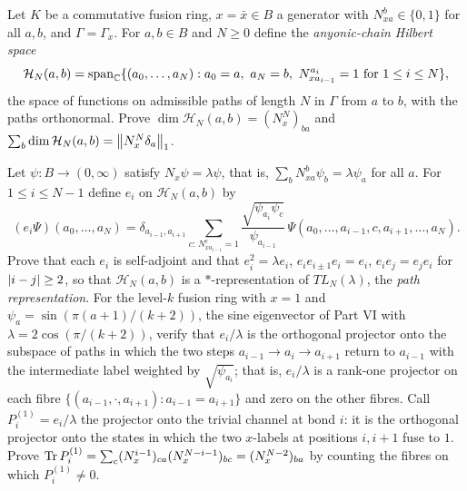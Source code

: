 \begin{exercise}
Let $K$ be a commutative fusion ring, $x=\bar x\in B$ a generator with $N_{xa}^b\in\{0,1\}$ for all $a,b$, and $\Gamma=\Gamma_x$. For $a,b\in B$ and $N\ge0$ define the \emph{anyonic-chain Hilbert space}
\[
\mathcal H_N(a,b)=\mathrm{span}_\C\{(a_0,\dots,a_N):a_0=a,\ a_N=b,\ N_{xa_{i-1}}^{a_i}=1\text{ for }1\le i\le N\},
\]
the space of functions on admissible paths of length $N$ in $\Gamma$ from $a$ to $b$, with the paths orthonormal. Prove $\dim\mathcal H_N(a,b)=(N_x^N)_{ba}$ and $\sum_b\dim\mathcal H_N(a,b)=\left\lVert N_x^N\delta_a\right\rVert_1$.

Let $\psi\colon B\to(0,\infty)$ satisfy $N_x\psi=\lambda\psi$, that is, $\sum_bN_{xa}^b\psi_b=\lambda\psi_a$ for all $a$. For $1\le i\le N-1$ define $e_i$ on $\mathcal H_N(a,b)$ by
\[
(e_i\Psi)(a_0,\dots,a_N)=\delta_{a_{i-1},a_{i+1}}\sum_{c:\,N_{xa_{i-1}}^c=1}\frac{\sqrt{\psi_{a_i}\psi_c}}{\psi_{a_{i-1}}}\,\Psi(a_0,\dots,a_{i-1},c,a_{i+1},\dots,a_N).
\]
Prove that each $e_i$ is self-adjoint and that $e_i^2=\lambda e_i$, $e_ie_{i\pm1}e_i=e_i$, $e_ie_j=e_je_i$ for $\left\lvert i-j\right\rvert\ge2$, so that $\mathcal H_N(a,b)$ is a $*$-representation of $TL_N(\lambda)$, the \emph{path representation}. For the level-$k$ fusion ring with $x=1$ and $\psi_a=\sin(\pi(a+1)/(k+2))$, the sine eigenvector of Part VI with $\lambda=2\cos(\pi/(k+2))$, verify that $e_i/\lambda$ is the orthogonal projector onto the subspace of paths in which the two steps $a_{i-1}\to a_i\to a_{i+1}$ return to $a_{i-1}$ with the intermediate label weighted by $\sqrt{\psi_{a_i}}$; that is, $e_i/\lambda$ is a rank-one projector on each fibre $\{(a_{i-1},\cdot,a_{i+1}):a_{i-1}=a_{i+1}\}$ and zero on the other fibres. Call $P^{(1)}_i=e_i/\lambda$ the projector onto the trivial channel at bond $i$: it is the orthogonal projector onto the states in which the two $x$-labels at positions $i,i+1$ fuse to $1$. Prove $\operatorname{Tr} P^{(1)}_i=\sum_c(N_x^{i-1})_{ca}(N_x^{N-i-1})_{bc}=(N_x^{N-2})_{ba}$ by counting the fibres on which $P^{(1)}_i\ne0$.
\end{exercise}

